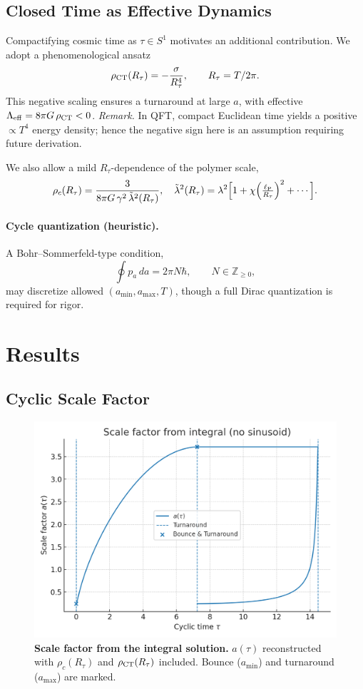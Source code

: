 \documentclass[12pt]{article}
\begin{document}
\subsection{Closed Time as Effective Dynamics}
Compactifying cosmic time as $\tau\in S^1$ motivates an additional contribution.
We adopt a phenomenological ansatz
\begin{equation}
\rho_{\rm CT}(R_\tau) = -\frac{\sigma}{R_\tau^4}, \qquad R_\tau=T/2\pi.
\end{equation}
This negative scaling ensures a turnaround at large $a$, with effective
$\Lambda_{\rm eff}=8\pi G\,\rho_{\rm CT}<0$.
\emph{Remark.} In QFT, compact Euclidean time yields a positive $\propto T^4$ energy density;
hence the negative sign here is an assumption requiring future derivation.

We also allow a mild $R_\tau$-dependence of the polymer scale,
\[
\rho_c(R_\tau)=\frac{3}{8\pi G\,\gamma^2\,\tilde\lambda^2(R_\tau)},\quad
\tilde\lambda^2(R_\tau)=\lambda^2\Big[1+\chi\Big(\tfrac{\ell_{\rm P}}{R_\tau}\Big)^2+\cdots\Big].
\]

\paragraph{Cycle quantization (heuristic).}
A Bohr--Sommerfeld-type condition,
\[
\oint p_a\,da = 2\pi N \hbar, \qquad N\in\mathbb{Z}_{\ge 0},
\]
may discretize allowed $(a_{\min},a_{\max},T)$, though a full Dirac quantization is required
for rigor.

\section{Results}
\subsection{Cyclic Scale Factor}
\begin{figure}[H]
\centering
\includegraphics[width=0.78\linewidth]{figures/plot_a_tau_from_integral.png}
\caption{\textbf{Scale factor from the integral solution.}
$a(\tau)$ reconstructed with $\rho_c(R_\tau)$ and $\rho_{\rm CT}(R_\tau)$ included.
Bounce ($a_{\min}$) and turnaround ($a_{\max}$) are marked.}
\end{figure}
\end{document}
